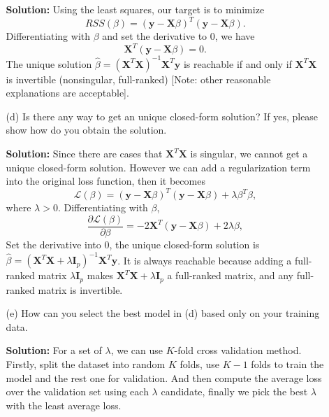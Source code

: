 \documentclass[10pt]{article}
\begin{document}
\begin{enumerate}[1.]
\begin{itemize}
			\textbf{Solution:} Using the least squares, our target is to minimize $$RSS(\beta)=(\mathbf{y}-\mathbf{X}\beta)^T(\mathbf{y}-\mathbf{X}\beta).$$ 
			Differentiating with $\beta$ and set the derivative to 0, 
			we have $$\mathbf{X}^T(\mathbf{y}-\mathbf{X}\beta)=0.$$
			The unique solution $\hat{\beta}=(\mathbf{X}^T\mathbf{X})^{-1}\mathbf{X}^T\mathbf{y}$ 
			is reachable if and only if $\mathbf{X}^T\mathbf{X}$ is invertible (nonsingular, full-ranked) 
			[Note: other reasonable explanations are acceptable].\\
			
			
			\item[(d)] Is there any way to get an unique closed-form solution? If yes, please show how do you obtain the solution.~
			
			\textbf{Solution:} Since there are cases that $\mathbf{X}^T\mathbf{X}$ is singular, 
			we cannot get a unique closed-form solution. However we can add a regularization term 
			into the original loss function, then it becomes 
			$$\mathcal{L}(\beta)=(\mathbf{y}-\mathbf{X}\beta)^T(\mathbf{y}-\mathbf{X}\beta)+\lambda\beta^T\beta,$$ where $\lambda>0$. 
			Differentiating with $\beta$, $$\frac{\partial\mathcal{L}(\beta)}{\partial \beta}=-2\mathbf{X}^T(\mathbf{y}-\mathbf{X}\beta)+2\lambda\beta,$$
			Set the derivative into 0, the unique closed-form solution 
			is $\hat{\beta}=(\mathbf{X}^T\mathbf{X}+\lambda\mathbf{I}_p)^{-1}\mathbf{X}^T\mathbf{y}$. 
			It is always reachable because adding a full-ranked matrix $\lambda\mathbf{I}_p$ 
			makes $\mathbf{X}^T\mathbf{X}+\lambda\mathbf{I}_p$ a full-ranked matrix, and any full-ranked matrix is invertible.\\
			
			
			
			
			\item[(e)] How can you select the best model in (d) based only on your training data.~
			
			
			\textbf{Solution:} For a set of $\lambda$, we can use $K$-fold cross validation method. 
			Firstly, split the dataset into random $K$ folds, use $K-1$ folds to train the model and 
			the rest one for validation. And then compute the average loss over the validation set 
			using each $\lambda$ candidate, finally we pick the best $\lambda$ with the least average loss.
			
			
			
			
		\end{itemize}
               

\end{enumerate}
\end{document}
